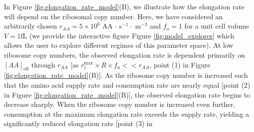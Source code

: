 In Figure \ref{fig:elongation_rate_model}(B), we illustrate how the elongation rate will
depend on the ribosomal copy number. Here, we have considered an arbitrarily
chosen $r_{AA} = 5\times 10^6$ AA $\cdot$ s$^{-1} \cdot$ \textmu m$^{-3}$ and
$f_a = 1$ for a unit cell volume $V = 1$fL (we provide the interactive figure
Figure \ref{fig:model_explorer} which allows the user to explore
different regimes of this parameter space). At low ribosome copy numbers,
the
observed elongation rate is dependent primarily on $[AA]_\text{eff}$ through
$r_{AA}$ [as $r_t^{\text{max}} \times R \times f_a << r_{AA}$, point (1) in
Figure \ref{fig:elongation_rate_model}(B)]. As the ribosome copy number is increased
such that the amino acid supply rate and consumption rate are nearly equal
[point (2) in Figure \ref{fig:elongation_rate_model}(B)], the observed elongation rate
begins to decrease sharply. When the ribosome copy number is increased even
further, consumption at the maximum elongation rate exceeds the supply rate,
yielding a significantly reduced elongation rate [point (3) in
